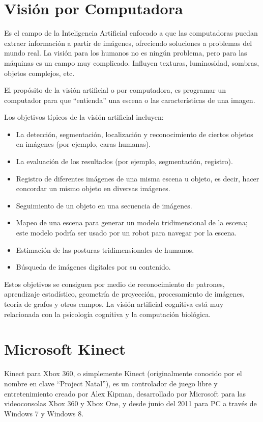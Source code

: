 \section{Visión por Computadora}
Es el campo de la Inteligencia Artificial enfocado a que las computadoras puedan extraer información a partir de imágenes, ofreciendo soluciones a problemas del mundo real. La visión para los humanos no es ningún problema, pero para las máquinas es un campo muy complicado. Influyen texturas, luminosidad, sombras, objetos complejos, etc.

El propósito de la visión artificial o por computadora, es programar un computador para que ``entienda'' una escena o las características de una imagen.

Los objetivos típicos de la visión artificial incluyen:

\begin{itemize}
	\itemsep1pt \parskip1pt 
	\item La detección, segmentación, localización y reconocimiento de ciertos objetos en imágenes (por ejemplo, caras humanas).
	\item La evaluación de los resultados (por ejemplo, segmentación, registro).
	\item Registro de diferentes imágenes de una misma escena u objeto, es decir, hacer concordar un mismo objeto en diversas imágenes.
	\item Seguimiento de un objeto en una secuencia de imágenes.
	\item Mapeo de una escena para generar un modelo tridimensional de la escena; este modelo podría ser usado por un robot para navegar por la escena.
	\item Estimación de las posturas tridimensionales de humanos.
	\item Búsqueda de imágenes digitales por su contenido.
\end{itemize}

Estos objetivos se consiguen por medio de reconocimiento de patrones, aprendizaje estadístico, geometría de proyección, procesamiento de imágenes, teoría de grafos y otros campos. La visión artificial cognitiva está muy relacionada con la psicología cognitiva y la computación biológica.

\section{Microsoft Kinect}
Kinect para Xbox 360, o simplemente Kinect (originalmente conocido por el nombre en clave ``Project Natal''), es un controlador de juego libre y entretenimiento creado por Alex Kipman, desarrollado por Microsoft para las videoconsolas Xbox 360 y Xbox One, y desde junio del 2011 para PC a través de Windows 7 y Windows 8.


